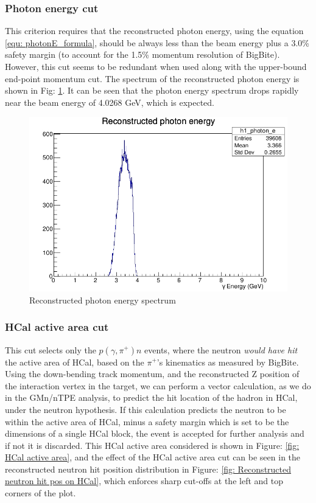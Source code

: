 \subsubsection{Photon energy cut}\label{Photon energy cut}
This criterion requires that the reconstructed photon energy, using the equation \ref{equ: photonE_formula}, should be always less than the beam energy plus a 3.0\% safety margin (to account for the 1.5\% momentum resolution of BigBite). However, this cut seems to be redundant when used along with the upper-bound end-point momentum cut. The spectrum of the reconstructed photon energy is shown in Fig: \ref{fig: Reconstructed photon energy}. It can be seen that the photon energy spectrum drops rapidly near the beam energy of 4.0268 GeV, which is expected.

\begin{figure}[h!]
    \centering
    \includegraphics[scale=0.75]{Images/sbs9_hydrogen_analysis/reconstructed_photonE.png}
    \caption{Reconstructed photon energy spectrum}
    \label{fig: Reconstructed photon energy}
\end{figure}

\subsubsection{HCal active area cut}\label{HCal active area cut}
This cut selects only the $p(\gamma,\pi^+)n$ events, where the neutron \textit{would have hit} the active area of HCal, based on the $\pi^+$'s kinematics as measured by BigBite. Using the down-bending track momentum, and the reconstructed Z position of the interaction vertex in the target, we can perform a vector calculation, as we do in the GMn/nTPE analysis, to predict the hit location of the hadron in HCal, under the neutron hypothesis. If this calculation predicts the neutron to be within the active area of HCal, minus a safety margin which is set to be the dimensions of a single HCal block, the event is accepted for further analysis and if not it is discarded. This HCal active area considered is shown in Figure: \ref{fig: HCal active area}, and the effect of the HCal active area cut can be seen in the reconstructed neutron hit position distribution in Figure: \ref{fig: Reconstructed neutron hit pos on HCal}, which enforces sharp cut-offs at the left and top corners of the plot.

